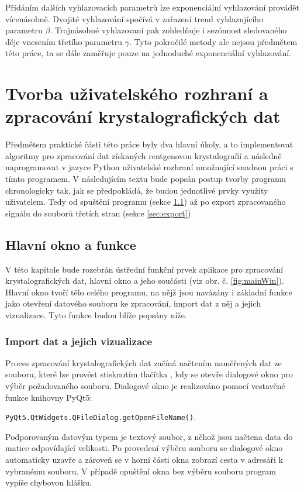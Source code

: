 \documentclass[a4paper, 12pt]{article}
\begin{document}
Přidáním dalších vyhlazovacích parametrů lze exponenciální vyhlazování provádět vícenásobně. Dvojité vyhlazování spočívá v zařazení trend vyhlazujícího parametru $\beta$. Trojnásobné vyhlazovaní pak zohledňuje i sezónnost sledovaného děje vnesením třetího parametru $\gamma$. Tyto pokročilé metody ale nejsou předmětem této práce, ta se dále zaměřuje pouze na jednoduché exponenciální vyhlazování.

\newpage
\section{Tvorba uživatelského rozhraní a zpracování krystalografických dat}
Předmětem praktické části této práce byly dva hlavní úkoly, a to implementovat algoritmy pro zpracování dat získaných rentgenovou krystalografií a následně naprogramovat v jazyce Python uživatelské rozhraní umožnující snadnou práci s tímto programem. V následujícím textu bude popsán postup tvorby programu chronologicky tak, jak se předpokládá, že budou jednotlivé prvky využity uživatelem. Tedy od spuštění programu (sekce \ref{sec:mainwin}) až po export zpracovaného signálu do souborů třetích stran (sekce \ref{sec:export}) 

\subsection{Hlavní okno a funkce} \label{sec:mainwin}
V této kapitole bude rozebrán ústřední funkční prvek aplikace pro zpracování krystalografických dat, hlavní okno a jeho součásti (viz obr. č. \ref{fig:mainWin}). Hlavní okno tvoří tělo celého programu, na nějž jsou navázány i základní funkce jako otevření datového souboru ke zpracování, import dat z něj a jejich vizualizace. Tyto funkce budou blíže popsány níže.

\subsubsection{Import dat a jejich vizualizace} \label{sec:import}
Proces zpracování krystalografických dat začíná načtením naměřených dat ze souboru, které lze provést stisknutím tlačítka , kdy se otevře dialogové okno pro výběr požadovaného souboru. Dialogové okno je realizováno pomocí vestavěné funkce knihovny PyQt5:
\begin{center}
 \texttt{PyQt5.QtWidgets.QFileDialog.getOpenFileName()}.   
\end{center}
\noindent Podporovaným datovým typem je textový soubor, z něhož jsou načtena data do matice odpovídající velikosti. Po provedení výběru souboru se dialogové okno automaticky uzavře a zároveň se v horní části okna zobrazí cesta v adresáři k vybranému souboru. V případě opuštění okna bez výběru souboru program vypíše chybovou hlášku. 
\end{document}
